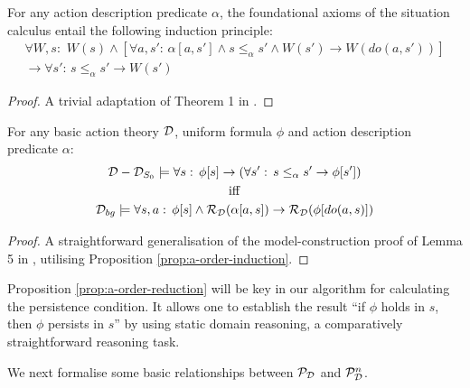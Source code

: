 \begin{prop}
For any action description predicate $\alpha$, the foundational axioms
of the situation calculus entail the following induction principle:\label{prop:a-order-induction}\begin{multline*}
\forall W,s:\,\, W(s)\wedge\left[\forall a,s':\,\alpha[a,s']\wedge s\leq_{\alpha}s'\wedge W(s')\rightarrow W(do(a,s'))\right]\\
\rightarrow\forall s':\, s\leq_{\alpha}s'\rightarrow W(s')\end{multline*}

\end{prop}
\begin{proof}
A trivial adaptation of Theorem 1 in \citep{Reiter93proving}. 
\end{proof}
\begin{prop}
For any basic action theory $\mathcal{D}$, uniform formula $\phi$ and action
description predicate $\alpha$:\label{prop:a-order-reduction}\begin{gather*}
\mathcal{D}-\mathcal{D}_{S_{0}}\models\forall s:\,\phi[s]\rightarrow\left(\forall s':\, s\leq_{\alpha}s'\rightarrow\phi[s']\right)\\
\mathrm{iff}\\
\mathcal{D}_{bg}\models\forall s,a:\,\phi[s]\wedge\mathcal{R}_{\mathcal{D}}(\alpha[a,s])\rightarrow\mathcal{R}_{\mathcal{D}}(\phi[do(a,s)])\end{gather*}

\end{prop}
\begin{proof}
A straightforward generalisation of the model-construction proof of
Lemma 5 in \citep{Lin94-StateConstraints}, utilising Proposition
\ref{prop:a-order-induction}. 
\end{proof}
Proposition \ref{prop:a-order-reduction} will be key in our algorithm
for calculating the persistence condition. It allows one to establish
the result {}``if $\phi$ holds in $s$, then $\phi$ persists in
$s$'' by using static domain reasoning, a comparatively straightforward
reasoning task.

We next formalise some basic relationships between $\mathcal{P}_{\mathcal{D}}$ and
$\mathcal{P}_{\mathcal{D}}^{n}$.


